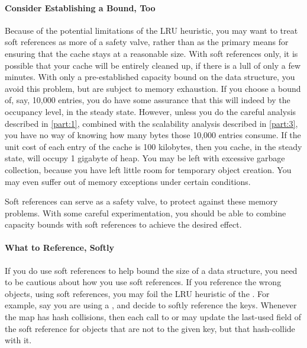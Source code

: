 \paragraph{Consider Establishing a Bound, Too}
Because of the potential limitations of the LRU heuristic, you may want to treat
soft references as more of a safety valve, rather than as the primary means for
ensuring that the cache stays at a reasonable size. With soft references only,
it is possible that your cache will be entirely cleaned up, if there is a lull
of only a few minutes. With only a pre-established capacity bound on the data
structure, you avoid this problem, but are subject to memory exhaustion. If you
choose a bound of, say, 10,000 entries, you do have some assurance that this
will indeed by the occupancy level, in the steady state. However, unless you do
the careful analysis described in \autoref{part:1}, combined with the
scalability analysis described in \autoref{part:3}, you have no way of knowing
how many bytes those 10,000 entries consume. If the unit cost of each entry of
the cache is 100 kilobytes, then you cache, in the steady state, will occupy 1
gigabyte of heap. You may be left with excessive garbage collection, because you
have left little room for temporary object creation. You may even suffer out of
memory exceptions under certain conditions.

Soft references can serve as a safety valve, to protect against these memory
problems. With some careful experimentation, you should be able to combine
capacity bounds with soft references to achieve the desired effect.

\paragraph{What to Reference, Softly}
If you do use soft references to help bound the size of a data structure, you
need to be cautious about how you use soft references. If you reference the
wrong objects, using soft references, you may foil the LRU heuristic of the
\jre. For example, say you are using a , and decide to softly
reference the keys. Whenever the map has hash collisions, then each call to
 or  may update the last-used field of the soft reference
for objects that are not  to the given key, but that hash-collide
with it.


